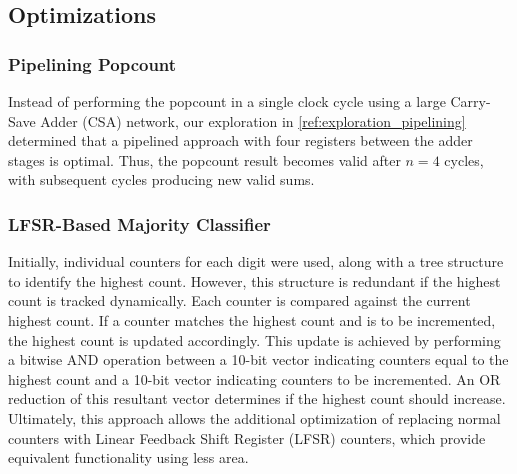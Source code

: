 \documentclass[conference]{IEEEtran}
\begin{document}



\subsection{Optimizations}
\subsubsection{Pipelining Popcount}
\label{ref:pipeline_popcount}

Instead of performing the popcount in a single clock cycle using a large Carry-Save Adder (CSA) network, our exploration in \autoref{ref:exploration_pipelining} determined that a pipelined approach with four registers between the adder stages is optimal. Thus, the popcount result becomes valid after $n=4$ cycles, with subsequent cycles producing new valid sums.

\subsubsection{LFSR-Based Majority Classifier}

Initially, individual counters for each digit were used, along with a tree structure to identify the highest count. However, this structure is redundant if the highest count is tracked dynamically. Each counter is compared against the current highest count. If a counter matches the highest count and is to be incremented, the highest count is updated accordingly. This update is achieved by performing a bitwise AND operation between a 10-bit vector indicating counters equal to the highest count and a 10-bit vector indicating counters to be incremented. An OR reduction of this resultant vector determines if the highest count should increase. 
Ultimately, this approach allows the additional optimization of replacing normal counters with Linear Feedback Shift Register (LFSR) counters, which provide equivalent functionality using less area.
\end{document}

